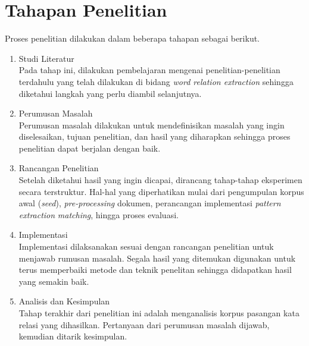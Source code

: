 \section{Tahapan Penelitian}
Proses penelitian dilakukan dalam beberapa tahapan sebagai berikut.
\begin{enumerate}
	\item Studi Literatur \\
	Pada tahap ini, dilakukan pembelajaran mengenai penelitian-penelitian terdahulu yang telah dilakukan di bidang \textit{word relation extraction} sehingga diketahui langkah yang perlu diambil selanjutnya.
	\item Perumusan Masalah \\
	Perumusan masalah dilakukan untuk mendefinisikan masalah yang ingin diselesaikan, tujuan penelitian, dan hasil yang diharapkan sehingga proses penelitian dapat berjalan dengan baik.
	\item Rancangan Penelitian \\
	Setelah diketahui hasil yang ingin dicapai, dirancang tahap-tahap eksperimen secara terstruktur. Hal-hal yang diperhatikan mulai dari pengumpulan korpus awal (\textit{seed}), \textit{pre-processing} dokumen, perancangan implementasi \textit{pattern extraction} \textit{matching}, hingga proses evaluasi.
	\item Implementasi \\
	Implementasi dilaksanakan sesuai dengan rancangan penelitian untuk menjawab rumusan masalah. Segala hasil yang ditemukan digunakan untuk terus memperbaiki metode dan teknik penelitan sehingga didapatkan hasil yang semakin baik.
	\item Analisis dan Kesimpulan \\
	Tahap terakhir dari penelitian ini adalah menganalisis korpus pasangan kata relasi yang dihasilkan. Pertanyaan dari perumusan masalah dijawab, kemudian ditarik kesimpulan.
\end{enumerate}

%

